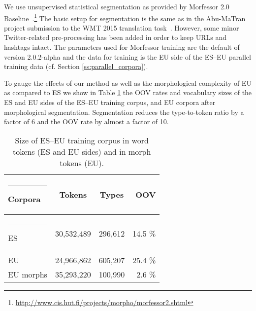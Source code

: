 \documentclass[postprint]{flammie}
\begin{document}
We use unsupervised statistical segmentation as provided by Morfessor 2.0 Baseline~\cite{morfessor}.\footnote{\url{http://www.cis.hut.fi/projects/morpho/morfessor2.shtml}} The basic setup for segmentation is the same as in the Abu-MaTran project submission to the WMT 2015 translation task~\cite{abumatran2015wmt}.
However, some minor Twitter-related pre-processing has been added in order to keep URLs and hashtags intact. The parameters used for Morfessor training are the default of version 2.0.2-alpha and the data for training is the EU side of the ES--EU parallel training data (cf. Section \ref{ss:parallel_corpora}).

To gauge the effects of our method as well as the morphological complexity of EU as compared to ES we show in Table \ref{table:morphs} the OOV rates and vocabulary sizes of the ES and EU sides of the ES--EU training corpus, and EU corpora after morphological segmentation.
Segmentation reduces the type-to-token ratio by a factor of 6 and the OOV rate by almost a factor of 10.

{\small
\begin{table}[t]
\begin{tabular}{lccr}
\hline\rule{-2pt}{15pt}
\bf Corpora & \bf Tokens & \bf Types & \bf OOV \\
\hline\rule{-4pt}{10pt}
ES & 30,532,489 & 296,612 & 14.5 \% \\
EU & 24,966,862 & 605,207 & 25.4 \% \\
EU morphs & 35,293,220 & 100,990 & 2.6 \% \\
\hline
\end{tabular}
\caption{Size of ES--EU training corpus in word tokens (ES and EU sides) and in morph tokens (EU).
\label{table:morphs}}
\end{table}
}

\end{document}

